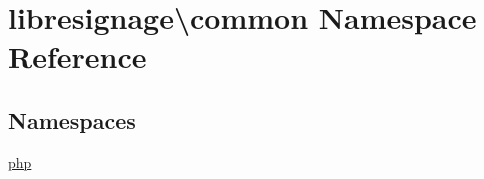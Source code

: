 \hypertarget{namespacelibresignage_1_1common}{}\section{libresignage\textbackslash{}common Namespace Reference}
\label{namespacelibresignage_1_1common}
\subsection*{Namespaces}
\begin{DoxyCompactItemize}
\item 
 \hyperlink{namespacelibresignage_1_1common_1_1php}{php}
\end{DoxyCompactItemize}
